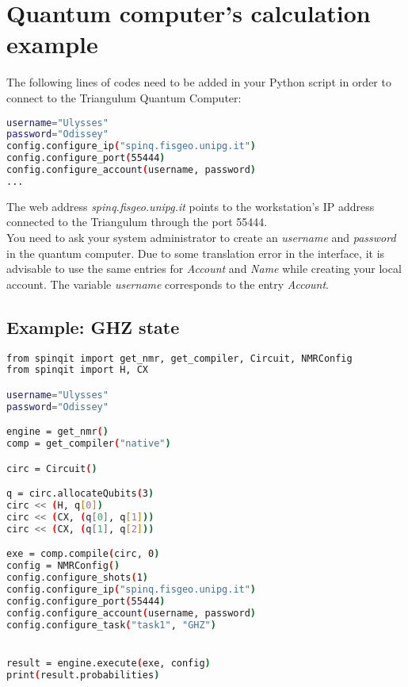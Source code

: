 \section{Quantum computer's calculation example}
The following lines of codes need to be added in your Python script in order to connect to the Triangulum Quantum Computer:

\begin{lstlisting}[language=bash]
username="Ulysses"
password="Odissey"
config.configure_ip("spinq.fisgeo.unipg.it")
config.configure_port(55444)
config.configure_account(username, password)
...
\end{lstlisting}

\noindent  The web address  \textit{spinq.fisgeo.unipg.it} points to the workstation's IP address connected to the Triangulum through the port 55444. \\

\noindent You need to ask your system administrator to create an \textit{username} and \textit{password} in the quantum computer.  
Due to some translation error in the interface, it is advisable to use the same entries for \textit{Account} and \textit{Name} while creating your local account. The variable  \textit{username} corresponds to the entry \textit{Account}.

\subsection{Example: GHZ state}
\begin{lstlisting}[language=bash]
from spinqit import get_nmr, get_compiler, Circuit, NMRConfig
from spinqit import H, CX

username="Ulysses"
password="Odissey"

engine = get_nmr()
comp = get_compiler("native")

circ = Circuit()

q = circ.allocateQubits(3)
circ << (H, q[0])
circ << (CX, (q[0], q[1]))
circ << (CX, (q[1], q[2]))

exe = comp.compile(circ, 0)
config = NMRConfig()
config.configure_shots(1)
config.configure_ip("spinq.fisgeo.unipg.it")
config.configure_port(55444)
config.configure_account(username, password)
config.configure_task("task1", "GHZ")


result = engine.execute(exe, config)
print(result.probabilities)
\end{lstlisting}
